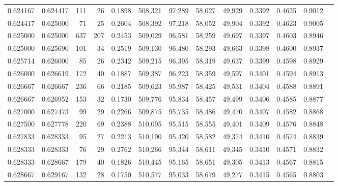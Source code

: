 \begin{tabular}{rrrrrrrrrrrrr}
0.624167 & 0.624417 &   111 &  26 &                                     0.1898 & 508,321 &  97,289 &  58,027 &  49,929 & 0.3392 & 0.4625 & 0.9012 \\
0.624417 & 0.625000 &    71 &  25 &                                     0.2604 & 508,392 &  97,218 &  58,052 &  49,904 & 0.3392 & 0.4623 & 0.9005 \\
0.625000 & 0.625000 &   637 & 207 &                                     0.2453 & 509,029 &  96,581 &  58,259 &  49,697 & 0.3397 & 0.4603 & 0.8946 \\
0.625000 & 0.625690 &   101 &  34 &                                     0.2519 & 509,130 &  96,480 &  58,293 &  49,663 & 0.3398 & 0.4600 & 0.8937 \\
0.625714 & 0.626000 &    85 &  26 &                                     0.2342 & 509,215 &  96,395 &  58,319 &  49,637 & 0.3399 & 0.4598 & 0.8929 \\
0.626000 & 0.626619 &   172 &  40 &                                     0.1887 & 509,387 &  96,223 &  58,359 &  49,597 & 0.3401 & 0.4594 & 0.8913 \\
0.626667 & 0.626667 &   236 &  66 &                                     0.2185 & 509,623 &  95,987 &  58,425 &  49,531 & 0.3404 & 0.4588 & 0.8891 \\
0.626667 & 0.626952 &   153 &  32 &                                     0.1730 & 509,776 &  95,834 &  58,457 &  49,499 & 0.3406 & 0.4585 & 0.8877 \\
0.627000 & 0.627473 &    99 &  29 &                                     0.2266 & 509,875 &  95,735 &  58,486 &  49,470 & 0.3407 & 0.4582 & 0.8868 \\
0.627500 & 0.627778 &   220 &  69 &                                     0.2388 & 510,095 &  95,515 &  58,555 &  49,401 & 0.3409 & 0.4576 & 0.8848 \\
0.627833 & 0.628333 &    95 &  27 &                                     0.2213 & 510,190 &  95,420 &  58,582 &  49,374 & 0.3410 & 0.4574 & 0.8839 \\
0.628333 & 0.628333 &    76 &  29 &                                     0.2762 & 510,266 &  95,344 &  58,611 &  49,345 & 0.3410 & 0.4571 & 0.8832 \\
0.628333 & 0.628667 &   179 &  40 &                                     0.1826 & 510,445 &  95,165 &  58,651 &  49,305 & 0.3413 & 0.4567 & 0.8815 \\
0.628667 & 0.629167 &   132 &  28 &                                     0.1750 & 510,577 &  95,033 &  58,679 &  49,277 & 0.3415 & 0.4565 & 0.8803 \\

\end{tabular}
